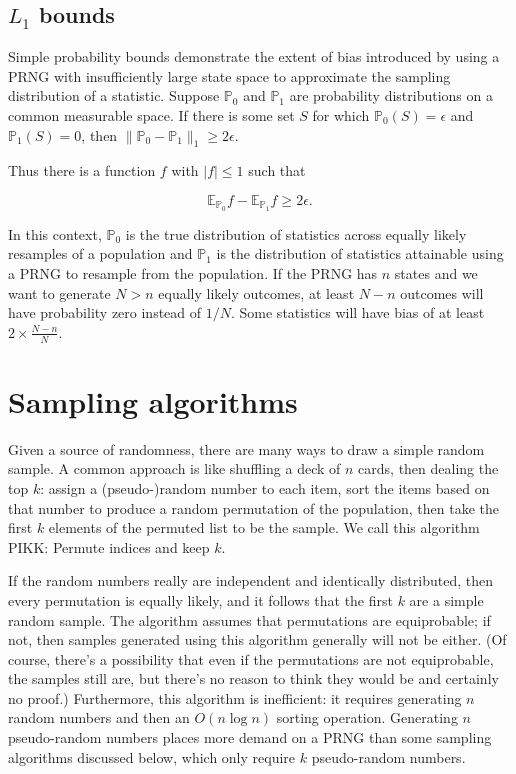 \documentclass[graybox]{svmult}
\begin{document}
\subsection{$L_1$ bounds}\label{sec:L1bounds}

Simple probability bounds demonstrate the extent of bias introduced by using a PRNG with insufficiently large
state space to approximate the sampling distribution of a statistic.
Suppose ${\mathbb P}_0$ and ${\mathbb P}_1$ are probability distributions on a common measurable space. 
If there is some set $S$ for which ${\mathbb P}_0(S) = \epsilon$ and ${\mathbb P}_1(S) = 0$, then $\|{\mathbb P}_0 - {\mathbb P}_1 \|_1 \ge 2 \epsilon$.

Thus there is a function $f$ with $|f| \le 1$ such that 

$${\mathbb E}_{{\mathbb P}_0}f -  {\mathbb E}_{{\mathbb P}_1}f \ge 2 \epsilon.$$

In this context, ${\mathbb P}_0$ is the true distribution of statistics across equally likely resamples of a population 
and ${\mathbb P}_1$ is the distribution of statistics attainable using a PRNG to resample from the population.
If the PRNG has $n$ states and we want to generate $N>n$ equally likely outcomes, at least $N-n$ outcomes will have probability zero instead of $1/N$.
Some statistics will have bias of at least $2 \times \frac{N-n}{N}$.

\section{Sampling algorithms}
\label{sec:algorithms}

Given a source of randomness, there are many ways to draw a simple random sample.
A common approach is like shuffling a deck of $n$ cards, then dealing the top $k$:
assign a (pseudo-)random number to each item, sort the items based on that number
to produce a random permutation of the population, 
then take the first $k$ elements of the permuted list to be the sample.
We call this algorithm PIKK: Permute indices and keep $k$.

If the random numbers really are independent and identically distributed, then every permutation is equally likely, 
and it follows that the first $k$ are a simple random sample.
The algorithm assumes that permutations are equiprobable; if not, then samples generated using this algorithm generally will not be either. 
(Of course, there's a possibility that even if the permutations are not equiprobable, the samples still
are, but there's no reason to think they would be and certainly no proof.)
Furthermore, this algorithm is inefficient: it requires generating $n$ random numbers and then an $O(n\log n)$ sorting operation.
Generating $n$ pseudo-random numbers places more demand on a PRNG than some sampling algorithms discussed below, which only require $k$ pseudo-random numbers.
\end{document}
